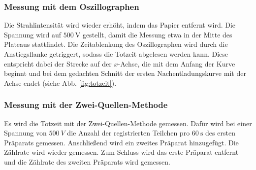 \subsubsection{Messung mit dem Oszillographen}
Die Strahlintensität wird wieder erhöht, indem das Papier entfernt wird.
Die Spannung wird auf $\SI{500}{\volt}$ gestellt, damit die Messung etwa in der Mitte des Plateaus stattfindet.
Die Zeitablenkung des Oszillographen wird durch die Anstiegsflanke getriggert, sodass die Totzeit abgelesen werden kann. Diese entspricht dabei der Strecke auf der $x$-Achse, die mit dem Anfang der Kurve beginnt und bei dem gedachten Schnitt der ersten Nachentladungskurve mit der Achse endet (siehe Abb. \ref{fig:totzeit}).

\subsubsection{Messung mit der Zwei-Quellen-Methode}
Es wird die Totzeit mit der Zwei-Quellen-Methode gemessen. Dafür wird bei einer Spannung von $\SI{500}{V}$ die Anzahl der registrierten Teilchen pro $\SI{60}{\second}$ des ersten Präparats gemessen. Anschließend wird ein zweites Präparat hinzugefügt. Die Zählrate wird wieder gemessen. Zum Schluss wird das erste Präparat entfernt und die Zählrate des zweiten Präparats wird gemessen.